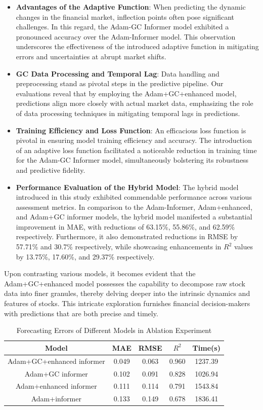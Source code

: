 \documentclass[sn-mathphys,Numbered]{sn-jnl}
\theoremstyle{thmstyleone}%
\theoremstyle{thmstyletwo}%
\theoremstyle{thmstylethree}%
\begin{document}
\begin{itemize}
\item \textbf{Advantages of the Adaptive Function}:
When predicting the dynamic changes in the financial market, inflection points often pose significant challenges. In this regard, the Adam-GC Informer model exhibited a pronounced accuracy over the Adam-Informer model. This observation underscores the effectiveness of the introduced adaptive function in mitigating errors and uncertainties at abrupt market shifts.
\item \textbf{GC Data Processing and Temporal Lag}:
Data handling and preprocessing stand as pivotal steps in the predictive pipeline. Our evaluations reveal that by employing the Adam+GC+enhanced model, predictions align more closely with actual market data, emphasizing the role of data processing techniques in mitigating temporal lags in predictions.
\item \textbf{Training Efficiency and Loss Function}:
An efficacious loss function is pivotal in ensuring model training efficiency and accuracy. The introduction of an adaptive loss function facilitated a noticeable reduction in training time for the Adam-GC Informer model, simultaneously bolstering its robustness and predictive fidelity.
\item \textbf{Performance Evaluation of the Hybrid Model}:
The hybrid model introduced in this study exhibited commendable performance across various assessment metrics. In comparison to the Adam-Informer, Adam+enhanced, and Adam+GC informer models, the hybrid model manifested a substantial improvement in MAE, with reductions of 63.15\%, 55.86\%, and 62.59\% respectively. Furthermore, it also demonstrated reductions in RMSE by 57.71\% and 30.7\% respectively, while showcasing enhancements in $R^2$ values by 13.75\%, 17.60\%, and 29.37\% respectively.
\end{itemize}

Upon contrasting various models, it becomes evident that the Adam+GC+enhanced model possesses the capability to decompose raw stock data into finer granules, thereby delving deeper into the intrinsic dynamics and features of stocks. This intricate exploration furnishes financial decision-makers with predictions that are both precise and timely.

\begin{table}[h]
\caption{Forecasting Errors of Different Models in Ablation Experiment}\label{error_disso}%
\centering
\begin{tabular}{@{}ccccc@{}}
\toprule
\textbf{Model} & \textbf{MAE}& \textbf{RMSE}& \textbf{$R^2$} & \textbf{Time(s)}\\
\midrule
Adam+GC+enhanced informer & 0.049 & 0.063 & 0.960 & 1237.39 \\
Adam+GC informer & 0.102 & 0.091 & 0.828 & 1026.94 \\
Adam+enhanced informer & 0.111 & 0.114 & 0.791 & 1543.84 \\
Adam+informer & 0.133 & 0.149 & 0.678 & 1836.41 \\
\bottomrule
\end{tabular}
\end{table}
\end{document}
